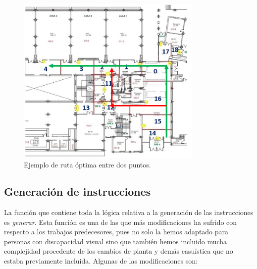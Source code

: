 \begin{figure}[t]
	\centering
	\includegraphics[width=0.8\textwidth]{Imagenes/Capitulo4/mapa_ruta_optima}
	\caption{Ejemplo de ruta óptima entre dos puntos.}
	\label{fig:ruta_optima}
\end{figure}

\subsection{Generación de instrucciones}
\label{sub:genInstruc}

La función que contiene toda la lógica relativa a la generación de las instrucciones es \textit{generar}. Esta función es una de las que más modificaciones ha sufrido con respecto a los trabajos predecesores, pues no solo la hemos adaptado para personas con discapacidad visual sino que también hemos incluido mucha complejidad procedente de los cambios de planta y demás casuística que no estaba previamente incluida. Algunas de las modificaciones son: 

